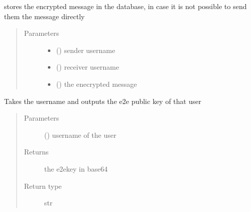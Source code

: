 \documentclass[letterpaper,10pt,english]{sphinxmanual}
\begin{document}
\begin{fulllineitems}
\label{\detokenize{db:db.storeMessageInDb}}
stores the encrypted message in the database, in case it is not possible to send them the message directly
\begin{quote}\begin{description}
\item[{Parameters}] \leavevmode\begin{itemize}
\item {} 
 () \textendash{} sender username

\item {} 
 () \textendash{} receiver username

\item {} 
 () \textendash{} the enecrypted message

\end{itemize}

\end{description}\end{quote}

\end{fulllineitems}


\begin{fulllineitems}
\label{\detokenize{db:db.getE2EPublicKey}}
Takes the username and outputs the e2e public key of that user
\begin{quote}\begin{description}
\item[{Parameters}] \leavevmode
{} () \textendash{} username of the user

\item[{Returns}] \leavevmode
the e2ekey in base64

\item[{Return type}] \leavevmode
str

\end{description}\end{quote}

\end{fulllineitems}
\end{document}
